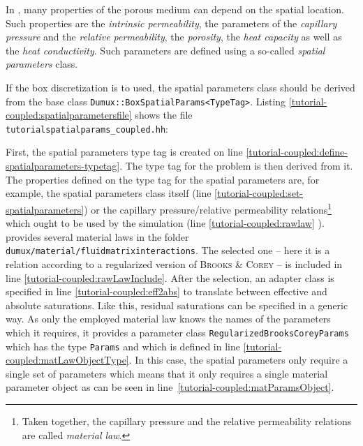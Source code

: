 In \Dumux, many properties of the porous medium can depend on the
spatial location. Such properties are the \textit{intrinsic
  permeability}, the parameters of the \textit{capillary pressure} and
the \textit{relative permeability}, the \textit{porosity}, the
\textit{heat capacity} as well as the \textit{heat conductivity}. Such
parameters are defined using a so-called \textit{spatial parameters}
class.

If the box discretization is to used, the spatial parameters class
should be derived from the base class
\texttt{Dumux::BoxSpatialParams<TypeTag>}. Listing
\ref{tutorial-coupled:spatialparametersfile} shows the file \\
\verb+tutorialspatialparams_coupled.hh+:

%

First, the spatial parameters type tag is created on line
\ref{tutorial-coupled:define-spatialparameters-typetag}. The type tag
for the problem is then derived from it. The \Dumux properties defined on
the type tag for the spatial parameters are, for example, the spatial
parameters class itself (line
\ref{tutorial-coupled:set-spatialparameters}) or the capillary
pressure/relative permeability relations\footnote{Taken together, the
  capillary pressure and the relative permeability relations are
  called \textit{material law}.} which ought to be used by the
simulation (line
\ref{tutorial-coupled:rawlaw} \label{tutorial-coupled:materialLaw}).
\Dumux provides several material laws in the folder
\verb+dumux/material/fluidmatrixinteractions+.  The selected one --
here it is a relation according to a regularized version of
\textsc{Brooks} \& \textsc{Corey} -- is included in line
\ref{tutorial-coupled:rawLawInclude}. 
After the selection, an adapter class is specified in line \ref{tutorial-coupled:eff2abs} to
translate between effective and absolute saturations. Like this,
residual saturations can be specified in a generic way.  As only the employed
material law knows the names of the parameters which it
requires, it provides a parameter class
\texttt{RegularizedBrooksCoreyParams} which has the type
\texttt{Params} and which is defined in line
\ref{tutorial-coupled:matLawObjectType}. In this case, the spatial
parameters only require a single set of parameters which means that it
only requires a single material parameter object as can be seen in
line~\ref{tutorial-coupled:matParamsObject}.

